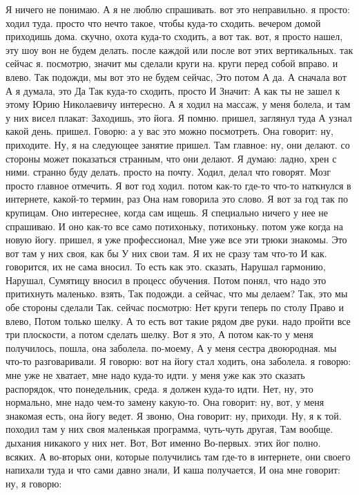 Я ничего не понимаю.
А я не люблю спрашивать.
вот это неправильно. я просто:
ходил туда. просто что нечто такое, чтобы куда-то сходить. вечером домой приходишь дома.
скучно, охота куда-то сходить, а вот так.
вот, я просто нашел, эту шоу вон не будем делать.
после каждой или после вот этих вертикальных.
так сейчас я.
посмотрю, значит мы сделали круги на.
круги перед собой вправо.
и влево. Так подожди, мы вот это не будем сейчас, Это потом А да.
А сначала вот А я думала, это Да Так куда-то сходить, просто И Значит: А как ты не зашел к этому Юрию Николаевичу интересно.
А я ходил на массаж, у меня болела, и там у них висел плакат: Заходишь, это йога. Я помню.
пришел, заглянул туда А узнал какой день.
пришел.
Говорю: а у вас это можно посмотреть.
Она говорит: ну, приходите.
Ну, я на следующее занятие пришел.
Там главное: ну, они делают. со стороны может показаться странным, что они делают.
Я думаю: ладно, хрен с ними. странно буду делать.
просто на почту.
Ходил, делал что говорят.
Мозг просто главное отмечить.
Я вот год ходил. потом как-то где-то что-то наткнулся в интернете, какой-то термин, раз Она нам говорила это слово.
Я вот за год так по крупицам.
Оно интереснее, когда сам ищешь.
Я специально ничего у нее не спрашиваю.
И оно как-то все само потихоньку, потихоньку. потом уже когда
на новую йогу.
пришел, я уже профессионал, Мне уже все эти трюки знакомы. Это вот там у них своя, как бы У них свои там. Я их не сразу там что-то И как.
говорится, их не сама вносил. То есть как это.
сказать, Нарушал гармонию, Нарушал, Сумятицу вносил в процесс обучения. Потом понял, что надо это притихнуть маленько.
взять, Так подожди. а сейчас, что мы делаем?
Так, это мы обе стороны сделали Так.
сейчас посмотрю: Нет круги теперь по столу Право и влево, Потом только шелку.
А то есть вот такие рядом две руки. надо пройти все три плоскости, а потом сделать шелку.
Вот я это, А потом как-то у меня получилось, пошла, она заболела.
по-моему, А у меня сестра
двоюродная. мы что-то разговаривали. Я говорю: вот на йогу стал ходить, она заболела. я говорю: мне уже не хватает, мне надо куда-то идти. у меня уже как это сказать распорядок, что понедельник, среда.
я должен куда-то идти.
Нет, ну, это нормально, мне надо чем-то замену какую-то. Она говорит: ну, вот, у меня знакомая есть, она йогу ведет. Я звоню, Она говорит: ну, приходи.
Ну, я к той.
походил там у них своя маленькая программа, чуть-чуть другая, Там вообще.
дыхания никакого у них нет.
Вот, Вот именно Во-первых.
этих йог полно.
всяких. А во-вторых они, которые получились там где-то в интернете, они своего напихали туда и что сами давно знали, И каша получается, И она мне говорит: ну, я говорю:
